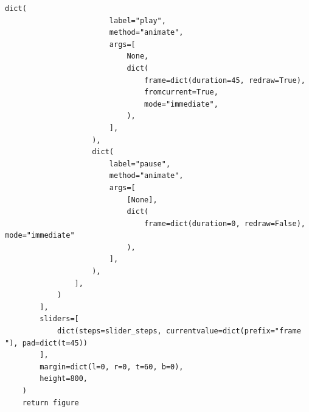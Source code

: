 \documentclass[11pt,a4paper]{book}
\begin{document}
\begin{lstlisting}[firstnumber=157]
                    dict(
                        label="play",
                        method="animate",
                        args=[
                            None,
                            dict(
                                frame=dict(duration=45, redraw=True),
                                fromcurrent=True,
                                mode="immediate",
                            ),
                        ],
                    ),
                    dict(
                        label="pause",
                        method="animate",
                        args=[
                            [None],
                            dict(
                                frame=dict(duration=0, redraw=False), mode="immediate"
                            ),
                        ],
                    ),
                ],
            )
        ],
        sliders=[
            dict(steps=slider_steps, currentvalue=dict(prefix="frame "), pad=dict(t=45))
        ],
        margin=dict(l=0, r=0, t=60, b=0),
        height=800,
    )
    return figure


\end{lstlisting}
\end{document}
